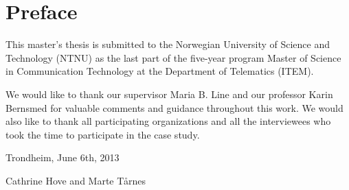\chapter*{Preface}
This master's thesis is submitted to the Norwegian University of Science and Technology (NTNU) as the last part of the five-year program Master of Science in Communication Technology at the Department of Telematics (ITEM).

We would like to thank our supervisor Maria B. Line and our professor Karin Bernsmed for valuable comments and guidance throughout this work. We would also like to thank all participating organizations and all the interviewees who took the time to participate in the case study.

Trondheim, June 6th, 2013

Cathrine Hove and Marte T\aa rnes